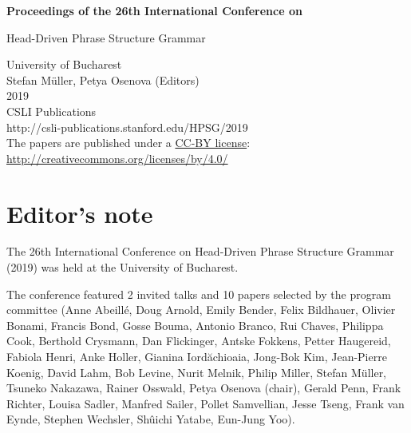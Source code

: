 \documentclass[11pt,a4paper,fleqn]{article}
\begin{document}
\begin{center}
{\Large
                {\bfseries Proceedings of the 26th International Conference on\par Head-Driven Phrase Structure Grammar\par}

                \vspace{8ex}

                     University of Bucharest\\[\baselineskip]

                        Stefan  M{\"u}ller, Petya Osenova (Editors)\\[\baselineskip]

                                2019\\[\baselineskip]

                          CSLI Publications\\[\baselineskip]

              http://csli-publications.stanford.edu/HPSG/2019 \\[4\baselineskip]

The papers are published under a \href{http://creativecommons.org/licenses/by/4.0/}{CC-BY license}:\\[3pt]
\href{http://creativecommons.org/licenses/by/4.0/}{http://creativecommons.org/licenses/by/4.0/}
}
\end{center}
\newpage
\tableofcontents

\newpage

\section*{Editor's note}
The 26th International Conference on Head-Driven Phrase Structure Grammar (2019) was held at
the University of Bucharest.

The conference featured 2 invited talks and 10 papers selected by the program committee 
(Anne Abeillé, 
Doug Arnold, 
Emily Bender, 
Felix Bildhauer, 
Olivier Bonami, 
Francis Bond, 
Gosse Bouma, 
Antonio Branco, 
Rui Chaves, 
Philippa Cook, 
Berthold Crysmann, 
Dan Flickinger, 
Antske Fokkens, 
Petter Haugereid, 
Fabiola Henri, 
Anke Holler, 
Gianina Iordăchioaia, 
Jong-Bok Kim, 
Jean-Pierre Koenig, 
David Lahm, 
Bob Levine, 
Nurit Melnik, 
Philip Miller, 
Stefan Müller, 
Tsuneko Nakazawa, 
Rainer Osswald, 
Petya Osenova (chair), 
Gerald Penn, 
Frank Richter, 
Louisa Sadler, 
Manfred Sailer, 
Pollet Samvellian, 
Jesse Tseng, 
Frank van Eynde, 
Stephen Wechsler, 
Shûichi Yatabe, 
Eun-Jung Yoo).
\end{document}
